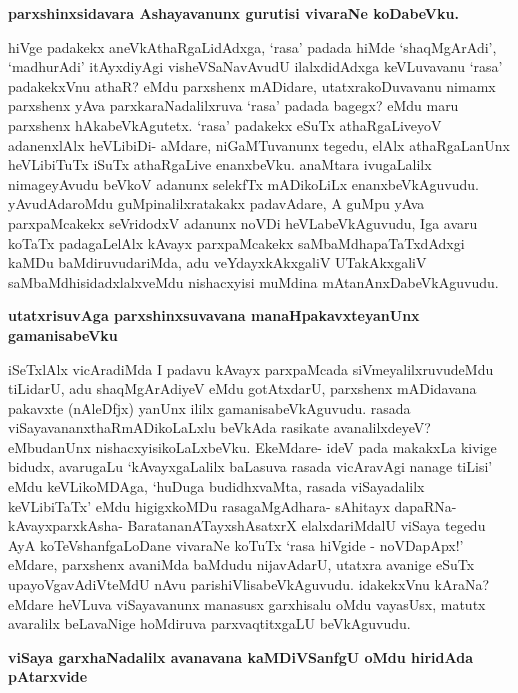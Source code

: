 {\bigskip
\noindent
{\large\bf parxshinxsidavara Ashayavanunx gurutisi vivaraNe koDabeVku.}}\label{page218}
\medskip

\noindent
hiVge padakekx aneVkAthaRgaLidAdxga, `rasa' padada hiMde `shaqMgArAdi', `madhurAdi' itAyxdiyAgi visheV\-SaNavAvudU ilalxdidAdxga keVLuvavanu `rasa' padakekxVnu athaR? eMdu parxshenx mADidare, utatxrakoDu\-vavanu nimamx parxshenx yAva parxkaraNadalilxruva `rasa' padada bagegx? eMdu maru parxshenx hAkabeVkAgutetx. `rasa' padakekx eSuTx athaR\-gaLiveyoV adanenxlAlx heVLibiDi- aMdare, niGaMTuvanunx tegedu, elAlx athaR\break\-gaLanUnx heVLibiTuTx iSuTx athaRgaLive enanxbeVku. anaMtara ivugaLalilx nimage\break yAvudu beVkoV adanunx selekfTx mADi\-koLiLx enanxbeVkAguvudu. yAvudAda\-roMdu guMpinalilxratakakx padavAdare, A guMpu yAva parxpaMcakekx seVridodxV adanunx noVDi heVLabeVkAguvudu, Iga avaru koTaTx padagaLelAlx kAvayx parxpaMcakekx saMbaMdhapaTaTxdAdxgi kaMDu baMdiruvudariMda, adu veYdayxkAkxgaliV UTakAkxgaliV saMbaMdhisidadxlalx\-veMdu nishacxyisi muMdina mAtanAnxDabeVkAguvudu.

\newpage

{\noindent
{\large\bf utatxrisuvAga parxshinxsuvavana manaHpakavxteyanUnx gamanisabeVku}}\label{page219}
\medskip

\noindent
iSeTxlAlx vicAradiMda I padavu kAvayx parxpaMcada siVmeyalilxruvudeMdu tiLidarU, adu shaqM\-gArAdiyeV eMdu gotAtxdarU, parxshenx mADidavana pakavxte (nAleDfjx) yanUnx ililx gamanisabeVkAgu\-vudu. rasada viSayavananxthaRmADikoLaLxlu beVkAda rasikate avanalilxdeyeV? eMbudanUnx nishacxyisi\-koLaLxbeVku. EkeMdare- ideV pada makakxLa kivige bidudx, avarugaLu `kAvayxgaLalilx baLasuva rasada vicAra\-vAgi nanage tiLisi' eMdu keVLikoMDAga, `huDuga budidhxvaMta, rasada viSayadalilx keVLibiTaTx' eMdu higigxkoMDu rasagaMgAdhara- sAhitayx dapaRNa- kAvayxparxkAsha- BaratananATayxshAsatxrX elalxdariMdalU viSaya tegedu AyA koTeVshanfgaLoDane vivaraNe koTuTx `rasa hiVgide - noVDapApx!' eMdare, parxshenx avaniMda baMdudu nijavAdarU, utatxra avanige eSuTx upayoVgavAdiVteMdU nAvu parishiVlisabeVkAgu\-vudu. idakekxVnu kAraNa? eMdare heVLuva viSayavanunx manasusx garxhisalu oMdu vayasUsx, matutx avaralilx beLavaNige hoMdiruva parxvaqtitxgaLU beVkAguvudu.

{\bigskip
\noindent
{\large\bf viSaya garxhaNadalilx avanavana kaMDiVSanfgU oMdu hiridAda pAtarxvide}}\label{page219}
\medskip

